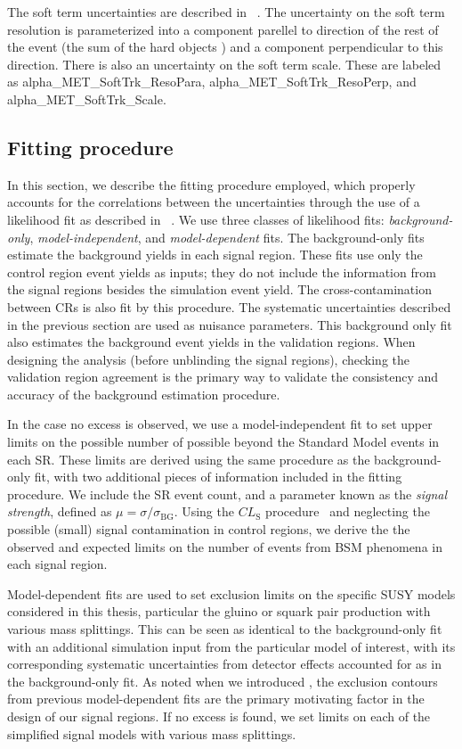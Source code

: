 The \met soft term uncertainties are described in ~\cite{PERF-2014-04,ATL-PHYS-PUB-2015-023,ATL-PHYS-PUB-2015-027}.
The uncertainty on the \met soft term resolution is parameterized into a component parellel to direction of the rest of the event (the sum of the hard objects \pt) and a component perpendicular to this direction.
There is also an uncertainty on the \met soft term scale.
These are labeled as alpha\_MET\_SoftTrk\_ResoPara, alpha\_MET\_SoftTrk\_ResoPerp, and alpha\_MET\_SoftTrk\_Scale.

\subsection{Fitting procedure}

In this section, we describe the fitting procedure employed, which properly accounts for the correlations between the uncertainties through the use of a likelihood fit as described in ~\cite{Baak:2014wma}.
We use three classes of likelihood fits: \textit{background-only}, \textit{model-independent}, and \textit{model-dependent} fits.
The background-only fits estimate the background yields in each signal region.
These fits use only the control region event yields as inputs; they do not include the information from the signal regions besides the simulation event yield.
The cross-contamination between CRs is also fit by this procedure.
The systematic uncertainties described in the previous section are used as nuisance parameters.
This background only fit also estimates the background event yields in the validation regions.
When designing the analysis (before unblinding the signal regions), checking the validation region agreement is the primary way to validate the consistency and accuracy of the background estimation procedure.

In the case no excess is observed, we use a model-independent fit to set upper limits on the possible number of possible beyond the Standard Model events in each SR.
These limits are derived using the same procedure as the background-only fit, with two additional pieces of information included in the fitting procedure.
We include the SR event count, and a parameter known as the \textit{signal strength}, defined as $\mu = \sigma/\sigma_{\mathrm{BG}}$.
Using the $CL_{\mathrm{S}}$ procedure~\cite{Feldman:1997qc} and neglecting the possible (small) signal contamination in control regions, we derive the the observed and expected limits on the number of events from BSM phenomena in each signal region.

Model-dependent fits are used to set exclusion limits on the specific SUSY models considered in this thesis, particular the gluino or squark pair production with various mass splittings.
This can be seen as identical to the background-only fit with an additional simulation input from the particular model of interest, with its corresponding systematic uncertainties from detector effects accounted for as in the background-only fit.
As noted when we introduced , the exclusion contours from previous model-dependent fits are the primary motivating factor in the design of our signal regions.
If no excess is found, we set limits on each of the simplified signal models with various mass splittings.
